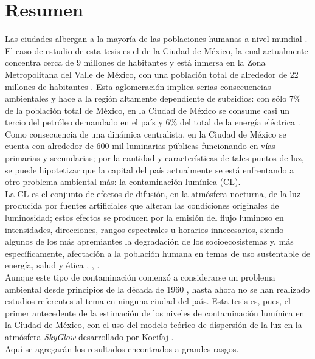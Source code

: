 \chapter{Resumen}

Las ciudades albergan a la mayoría de las poblaciones humanas a nivel mundial \citep{Zari2018}. El caso de estudio de esta tesis es el de la Ciudad de México, la cual actualmente concentra cerca de 9 millones de habitantes \citep{INEGI2015} y está inmersa en la Zona Metropolitana del Valle de México, con una población total de alrededor de 22 millones de habitantes \citep{OCDE2015}. Esta aglomeración implica serias consecuencias ambientales y hace a la región altamente dependiente de subsidios: con sólo 7\% de la población total de México, en la Ciudad de México se consume casi un tercio del petróleo demandado en el país y 6\% del total de la energía eléctrica \citep{SENER2013}.\\

Como consecuencia de una dinámica centralista, en la Ciudad de México se cuenta con alrededor de 600 mil luminarias públicas funcionando en vías primarias y secundarias; por la cantidad y características de tales puntos de luz, se puede hipotetizar que la capital del país actualmente se está enfrentando a otro problema ambiental más: la contaminación lumínica (CL).\\

La CL es el conjunto de efectos de difusión, en la atmósfera nocturna, de la luz producida por fuentes artificiales que alteran las condiciones originales de luminosidad; estos efectos se producen por la emisión del flujo luminoso en intensidades, direcciones, rangos espectrales u horarios innecesarios, siendo algunos de los más apremiantes la degradación de los socioecosistemas y, más específicamente, afectación a la población humana en temas de uso sustentable de energía, salud y ética \citep{AtlasREPSA}, \citep{LibroCL}, \citep{Stone2017}.\\

Aunque este tipo de contaminación comenzó a considerarse un problema ambiental desde principios de la década de 1960 \citep{LibroCL}, hasta ahora no se han realizado estudios referentes al tema en ninguna ciudad del país. Esta tesis es, pues, el primer antecedente de la estimación de los niveles de contaminación lumínica en la Ciudad de México, con el uso del modelo teórico de dispersión de la luz en la atmósfera \textit{SkyGlow} desarrollado por Kocifaj \citep{Kocifaj2007}.\\

Aquí se agregarán los resultados encontrados a grandes rasgos.

